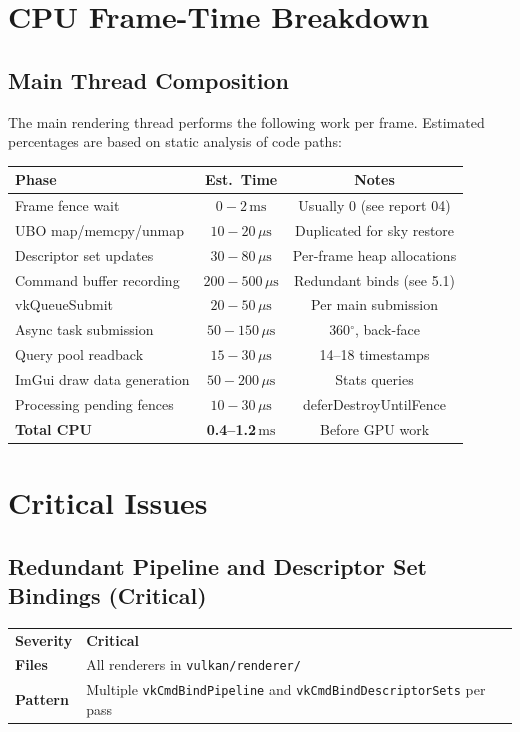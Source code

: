 \documentclass[a4paper,10pt]{article}
\newcommand{\ms}{\ensuremath{\,\text{ms}}}
\newcommand{\us}{\ensuremath{\,\mu\text{s}}}
\newcommand{\degree}{\ensuremath{^\circ}}
\newcommand{\severity}[1]{%
  \ifstrequal{#1}{Critical}{\textcolor{critical}{\textbf{#1}}}{%
  \ifstrequal{#1}{High}{\textcolor{high}{\textbf{#1}}}{%
  \ifstrequal{#1}{Medium}{\textcolor{medium}{\textbf{#1}}}{%
  \ifstrequal{#1}{Low}{\textcolor{low}{\textbf{#1}}}{#1}}}}}
\begin{document}
\section{CPU Frame-Time Breakdown}

\subsection{Main Thread Composition}

The main rendering thread performs the following work per frame. Estimated
percentages are based on static analysis of code paths:

\begin{center}
\begin{tabular}{lcc}
\toprule
\textbf{Phase} & \textbf{Est.\ Time} & \textbf{Notes} \\
\midrule
Frame fence wait & $0{-}2\ms$ & Usually 0 (see report 04) \\
UBO map/memcpy/unmap & $10{-}20\us$ & Duplicated for sky restore \\
Descriptor set updates & $30{-}80\us$ & Per-frame heap allocations \\
Command buffer recording & $200{-}500\us$ & Redundant binds (see 5.1) \\
vkQueueSubmit & $20{-}50\us$ & Per main submission \\
Async task submission & $50{-}150\us$ & 360\degree, back-face \\
Query pool readback & $15{-}30\us$ & 14--18 timestamps \\
ImGui draw data generation & $50{-}200\us$ & Stats queries \\
Processing pending fences & $10{-}30\us$ & deferDestroyUntilFence \\
\midrule
\textbf{Total CPU} & \textbf{0.4--1.2\ms} & Before GPU work \\
\bottomrule
\end{tabular}
\end{center}

\section{Critical Issues}

\subsection{Redundant Pipeline and Descriptor Set Bindings (Critical)}

\begin{tabular}{ll}
\textbf{Severity} & \severity{Critical} \\
\textbf{Files}     & All renderers in \texttt{vulkan/renderer/} \\
\textbf{Pattern}   & Multiple \texttt{vkCmdBindPipeline} and
                      \texttt{vkCmdBindDescriptorSets} per pass \\
\end{tabular}
\end{document}

